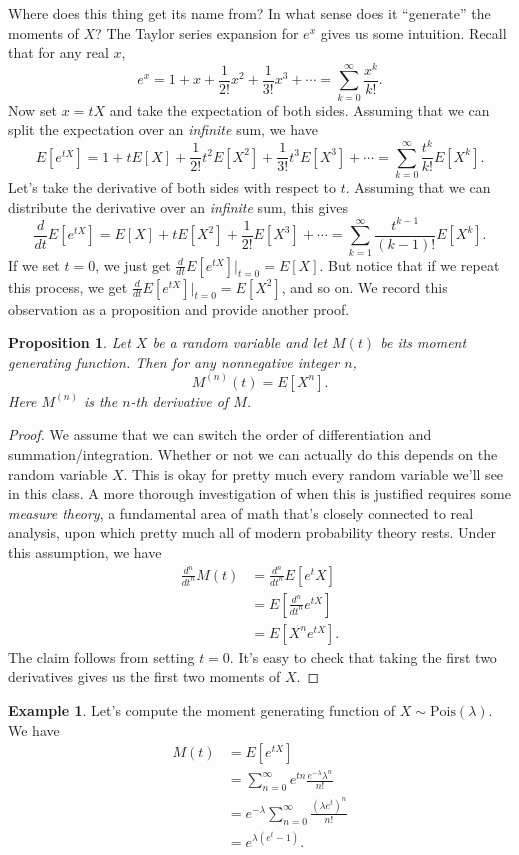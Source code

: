 \documentclass[12pt]{article}
\theoremstyle{plain}
\newtheorem{proposition}[theorem]{Proposition}
\theoremstyle{definition}
\newtheorem{example}[theorem]{Example}
\theoremstyle{remark}
\newcommand{\Pois}{\ensuremath{\textrm{Pois}}}
\begin{document}
Where does this thing get its name from?
In what sense does it ``generate'' the moments of $X$?
The Taylor series expansion for $e^x$ gives us some intuition.
Recall that for any real $x$,
\[
    e^x = 1 + x + \frac{1}{2!}x^2 + \frac{1}{3!}x^3 + \cdots = \sum_{k=0}^\infty \frac{x^k}{k!}.
\]
Now set $x = tX$ and take the expectation of both sides.
Assuming that we can split the expectation over an \emph{infinite} sum, we have
\[
    E[e^{tX}] = 1 + tE[X] + \frac{1}{2!}t^2E[X^2] + \frac{1}{3!}t^3E[X^3] + \cdots  = \sum_{k=0}^\infty \frac{t^k}{k!}E[X^k].
\]
Let's take the derivative of both sides with respect to $t$.
Assuming that we can distribute the derivative over an \emph{infinite} sum, this gives
\[
    \frac{d}{dt}E[e^{tX}] = E[X] + tE[X^2] + \frac{1}{2!}E[X^3] + \cdots = \sum_{k=1}^\infty\frac{t^{k-1}}{(k-1)!}E[X^k].
\]
If we set $t = 0$, we just get $\frac{d}{dt}E[e^{tX}]|_{t = 0} = E[X]$.
But notice that if we repeat this process, we get $\frac{d}{dt}E[e^{tX}]|_{t = 0} = E[X^2]$, and so on.
We record this observation as a proposition and provide another proof.
\begin{proposition}
    Let $X$ be a random variable and let $M(t)$ be its moment generating function.
    Then for any nonnegative integer $n$,
    \[
        M^{(n)}(t) = E[X^n].
    \]
    Here $M^{(n)}$ is the $n$-th derivative of $M$.
\end{proposition}
\begin{proof}
    We assume that we can switch the order of differentiation and summation/integration.
    Whether or not we can actually do this depends on the random variable $X$.
    This is okay for pretty much every random variable we'll see in this class.
    A more thorough investigation of when this is justified requires some \emph{measure theory}, a fundamental area of math that's closely connected to real analysis, upon which pretty much all of modern probability theory rests.
    Under this assumption, we have
    \begin{align*}
        \frac{d^n}{dt^n}M(t) &= \frac{d^n}{dt^n}E[e^tX]\\
        &= E\left[\frac{d^n}{dt^n}e^{tX}\right]\\
        &= E[X^ne^{tX}].
    \end{align*}
    The claim follows from setting $t = 0$.
    It's easy to check that taking the first two derivatives gives us the first two moments of $X$.
\end{proof}

\begin{example}
    Let's compute the moment generating function of $X\sim \Pois(\lambda)$.
    We have
    \begin{align*}
        M(t) &= E[e^{tX}]\\
        &= \sum_{n=0}^\infty e^{tn}\frac{e^{-\lambda}\lambda^n}{n!}\\
        &= e^{-\lambda}\sum_{n=0}^\infty\frac{(\lambda e^t)^n}{n!}\\
        &= e^{\lambda (e^t-1)}.
    \end{align*}
\end{example}
\end{document}
